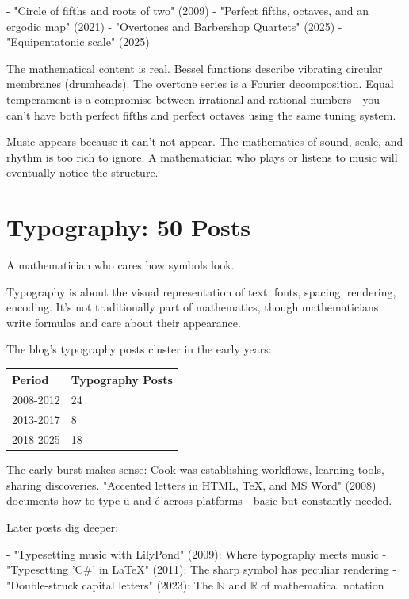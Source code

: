 - "Circle of fifths and roots of two" (2009)
- "Perfect fifths, octaves, and an ergodic map" (2021)
- "Overtones and Barbershop Quartets" (2025)
- "Equipentatonic scale" (2025)

The mathematical content is real. Bessel functions describe vibrating circular membranes (drumheads). The overtone series is a Fourier decomposition. Equal temperament is a compromise between irrational and rational numbers—you can't have both perfect fifths and perfect octaves using the same tuning system.

Music appears because it can't not appear. The mathematics of sound, scale, and rhythm is too rich to ignore. A mathematician who plays or listens to music will eventually notice the structure.

\bigskip

\section*{Typography: 50 Posts}

A mathematician who cares how symbols look.

Typography is about the visual representation of text: fonts, spacing, rendering, encoding. It's not traditionally part of mathematics, though mathematicians write formulas and care about their appearance.

The blog's typography posts cluster in the early years:

\begin{center}
\begin{tabular}{ll}
\toprule
\textbf{Period} & \textbf{Typography Posts} \\
\midrule
2008-2012 & 24 \\
2013-2017 & 8 \\
2018-2025 & 18 \\
\bottomrule
\end{tabular}
\end{center}

The early burst makes sense: Cook was establishing workflows, learning tools, sharing discoveries. "Accented letters in HTML, TeX, and MS Word" (2008) documents how to type ü and é across platforms—basic but constantly needed.

Later posts dig deeper:

- "Typesetting music with LilyPond" (2009): Where typography meets music
- "Typesetting 'C\#' in LaTeX" (2011): The sharp symbol has peculiar rendering
- "Double-struck capital letters" (2023): The $\mathbb{N}$ and $\mathbb{R}$ of mathematical notation

